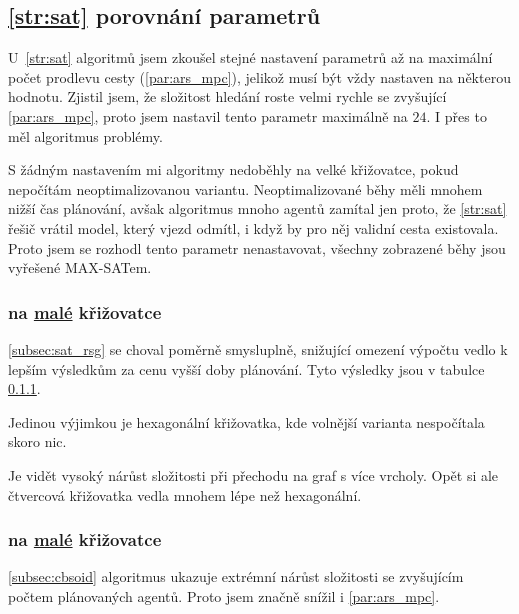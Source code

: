 \subsection{\ref{str:sat} porovnání parametrů}\label{subsec:sat_porovnani_parametru}

U~\ref{str:sat} algoritmů jsem zkoušel stejné nastavení parametrů až na maximální počet prodlevu cesty (\ref{par:ars_mpc}),
jelikož musí být vždy nastaven na některou hodnotu.
Zjistil jsem, že složitost hledání roste velmi rychle se zvyšující \ref{par:ars_mpc},
proto jsem nastavil tento parametr maximálně na $24$.
I přes to měl algoritmus problémy.

S žádným nastavením mi algoritmy nedoběhly na velké křižovatce, pokud nepočítám neoptimalizovanou variantu.
Neoptimalizované běhy měli mnohem nižší čas plánování, avšak algoritmus mnoho agentů zamítal jen proto, že \ref{str:sat}
řešič vrátil model, který vjezd odmítl, i když by pro něj validní cesta existovala.
Proto jsem se rozhodl tento parametr nenastavovat, všechny zobrazené běhy jsou vyřešené \textrm{MAX-SAT}em.

\subsubsection{ na \hyperref[par:data_mala]{malé} křižovatce}
\label{subsubsec:exp_satsg_mala_krizovatka}



\ref{subsec:sat_rsg} se choval poměrně smysluplně, snižující omezení výpočtu vedlo k lepším výsledkům
za cenu vyšší doby plánování.
Tyto výsledky jsou v tabulce \ref{subsubsec:exp_satsg_mala_krizovatka}.

Jedinou výjimkou je hexagonální křižovatka, kde volnější varianta nespočítala skoro nic.

Je vidět vysoký nárůst složitosti při přechodu na graf s více vrcholy.
Opět si ale čtvercová křižovatka vedla mnohem lépe než hexagonální.

\subsubsection{ na \hyperref[par:data_mala]{malé} křižovatce}
\label{subsubsec:exp_sata_mala_krizovatka}

\ref{subsec:cbsoid} algoritmus ukazuje extrémní nárůst složitosti se zvyšujícím počtem plánovaných agentů.
Proto jsem značně snížil i \ref{par:ars_mpc}.

